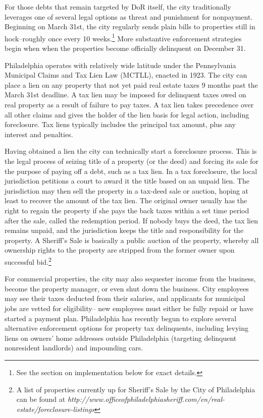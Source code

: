 \documentclass[12pt,titlepage]{article}
\begin{document}
For those debts that remain targeted by DoR itself, the city
traditionally leverages one of several legal options as threat and
punishment for nonpayment. Beginning on March 31st, the city regularly
sends plain bills to properties still in hock--roughly once every 10
weeks.\footnote{See the section on implementation below for exact
details.} More substantive enforcement strategies begin when 
when the properties become officially delinquent on December 31.

Philadelphia operates with relatively wide latitude under the
Pennsylvania Municipal Claims and Tax Lien Law (MCTLL), enacted in
1923. The city can place a lien on any property that not yet
paid real estate taxes 9 months past the March 31st deadline. A tax
lien may be imposed for delinquent taxes owed on real property as a
result of failure to pay taxes.  A tax lien takes precedence over all other 
claims and gives the holder of the lien basis for legal action, including foreclosure. 
Tax liens typically includes the principal tax amount, plus any interest and
penalties.

Having obtained a lien the city can technically start a foreclosure process. This
is the legal process of seizing title of a property (or the deed) and
forcing its sale for the purpose of paying off a debt, such as a tax
lien. In a tax foreclosure, the local jurisdiction petitions a court
to award it the title based on an unpaid lien. The jurisdiction may
then sell the property in a tax-deed sale or auction, hoping at least
to recover the amount of the tax lien. The original owner usually has the
right to regain the property if she  pays the back taxes within a
set time period after the sale, called the redemption period. If
nobody buys the deed, the tax lien remains unpaid, and the
jurisdiction keeps the title and responsibility for the
property. A Sheriff's Sale is basically a public auction
of the property, whereby all ownership rights to the property are
stripped from the former owner upon successful bid.\footnote{A list of
  properties currently up for Sheriff's Sale by the City of
  Philadelphia can be found at
  \it{http://www.officeofphiladelphiasheriff.com/en/real-estate/foreclosure-listings}}

For commercial properties, the city may also sequester income from the
business, become the property manager, or even shut down the
business. City employees may see their taxes deducted from their
salaries, and applicants for municipal jobs are vetted for eligibility--
new employees must either be fully repaid or have started a payment
plan. Philadelphia has recently begun to explore several
alternative enforcement options for property tax delinquents, including levying liens on owners'
home addresses outside Philadelphia (targeting delinquent
nonresident landlords) and impounding cars.
\end{document}
